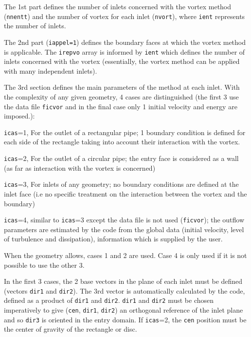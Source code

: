 {{{\begin{list}{-}{}
\item The 1st part defines the number of inlets concerned with the vortex
method (\texttt{nnentt}) and the number of vortex for each inlet
(\texttt{nvort}), where \texttt{ient} represents the number of inlets.
\item The 2nd part (\texttt{iappel=1}) defines the boundary faces at which the
      vortex method is applicable. The \texttt{irepvo} array is informed
      by \texttt{ient} which defines the number of inlets concerned with the vortex
(essentially, the vortex method can be applied with many independent inlets).
\item The 3rd section defines the main parameters of the method at each inlet.
      With the complexity of any given geometry, 4 cases are distinguished
      (the first 3 use the data file \texttt{ficvor} and in the final case only 1
      initial velocity and energy are imposed.):

\begin{list}{*}{}
\item \texttt{icas}=1, For the outlet of a rectangular pipe; 1 boundary condition is defined
for each side of the rectangle taking into account their interaction
with the vortex.
\item \texttt{icas}=2, For the outlet of a circular pipe; the entry face is considered as a
 wall (as far as interaction with the vortex is concerned)
\item \texttt{icas}=3, For inlets of any geometry; no boundary conditions are defined at the
 inlet face (i.e no specific treatment on the interaction between the
 vortex and the boundary)
\item \texttt{icas}=4, similar to \texttt{icas}=3 except the data file is not
 used (\texttt{ficvor}); the outflow
 parameters are estimated by the code from the global data (initial
 velocity, level of turbulence and dissipation), information which is
 supplied by the user.
\end{list}

When the geometry allows, cases 1 and 2 are used. Case 4 is only used
 if it is not possible to use the other 3.

In the first 3 cases, the 2 base vectors in the plane of each inlet
must be defined (vectors \texttt{dir1} and \texttt{dir2}). The 3rd vector is
automatically calculated by the code, defined as a product of \texttt{dir1} and
\texttt{dir2}. \texttt{dir1} and \texttt{dir2} must be chosen imperatively to
give (\texttt{cen}, \texttt{dir1}, \texttt{dir2}) an orthogonal reference of the
inlet plane and so \texttt{dir3} is oriented in the entry domain. If
\texttt{icas}=2, the \texttt{cen} position must be the center of gravity of the
rectangle or disc.


\end{list}}}}
